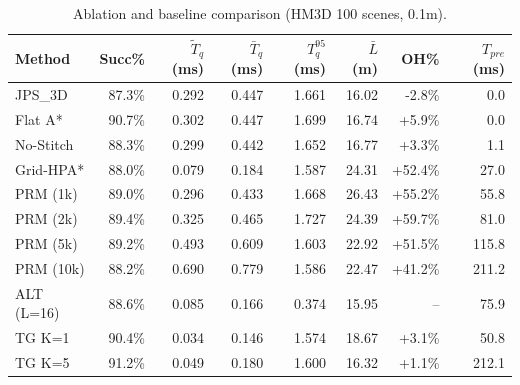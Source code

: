\begin{table}[t]
\centering
\caption{Ablation and baseline comparison (HM3D 100 scenes, 0.1m).}
\label{tab:ablation}
\begin{tabular}{l rrrr rrr}
\toprule
Method & Succ\% & $\tilde{T}_q$ (ms) & $\bar{T}_q$ (ms) & $T_q^{95}$ (ms) & $\bar{L}$ (m) & OH\% & $T_{pre}$ (ms) \\
\midrule
  JPS_3D & 87.3\% & 0.292 & 0.447 & 1.661 & 16.02 & -2.8\% & 0.0 \\
  Flat A* & 90.7\% & 0.302 & 0.447 & 1.699 & 16.74 & +5.9\% & 0.0 \\
  No-Stitch & 88.3\% & 0.299 & 0.442 & 1.652 & 16.77 & +3.3\% & 1.1 \\
  Grid-HPA* & 88.0\% & 0.079 & 0.184 & 1.587 & 24.31 & +52.4\% & 27.0 \\
  PRM (1k) & 89.0\% & 0.296 & 0.433 & 1.668 & 26.43 & +55.2\% & 55.8 \\
  PRM (2k) & 89.4\% & 0.325 & 0.465 & 1.727 & 24.39 & +59.7\% & 81.0 \\
  PRM (5k) & 89.2\% & 0.493 & 0.609 & 1.603 & 22.92 & +51.5\% & 115.8 \\
  PRM (10k) & 88.2\% & 0.690 & 0.779 & 1.586 & 22.47 & +41.2\% & 211.2 \\
  ALT (L=16) & 88.6\% & 0.085 & 0.166 & 0.374 & 15.95 & -- & 75.9 \\
  TG K=1 & 90.4\% & 0.034 & 0.146 & 1.574 & 18.67 & +3.1\% & 50.8 \\
  TG K=5 & 91.2\% & 0.049 & 0.180 & 1.600 & 16.32 & +1.1\% & 212.1 \\
\bottomrule
\end{tabular}
\end{table}